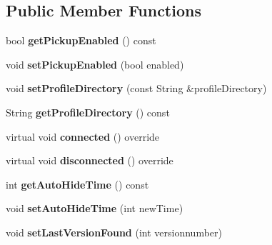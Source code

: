 \subsection*{Public Member Functions}
\begin{DoxyCompactItemize}
\item 
bool {\bfseries get\+Pickup\+Enabled} () const \hypertarget{class_settings_manager_abdb671f1012b61e3939d66e2c5a51ed6}{}\label{class_settings_manager_abdb671f1012b61e3939d66e2c5a51ed6}

\item 
void {\bfseries set\+Pickup\+Enabled} (bool enabled)\hypertarget{class_settings_manager_a625341681109806d4ab2b2501ba30ab9}{}\label{class_settings_manager_a625341681109806d4ab2b2501ba30ab9}

\item 
void {\bfseries set\+Profile\+Directory} (const String \&profile\+Directory)\hypertarget{class_settings_manager_a407dad99584114520c5aadc58b8bf941}{}\label{class_settings_manager_a407dad99584114520c5aadc58b8bf941}

\item 
String {\bfseries get\+Profile\+Directory} () const \hypertarget{class_settings_manager_aeaf4fd67dc3a4733dcf37bfadaa4de49}{}\label{class_settings_manager_aeaf4fd67dc3a4733dcf37bfadaa4de49}

\item 
virtual void {\bfseries connected} () override\hypertarget{class_settings_manager_a2d5e6d9c21a5ea7e574ca600a1d93719}{}\label{class_settings_manager_a2d5e6d9c21a5ea7e574ca600a1d93719}

\item 
virtual void {\bfseries disconnected} () override\hypertarget{class_settings_manager_a607feb1bce6a53dc2907653566a43977}{}\label{class_settings_manager_a607feb1bce6a53dc2907653566a43977}

\item 
int {\bfseries get\+Auto\+Hide\+Time} () const \hypertarget{class_settings_manager_a537a0bf338c4020efa197188a0deec49}{}\label{class_settings_manager_a537a0bf338c4020efa197188a0deec49}

\item 
void {\bfseries set\+Auto\+Hide\+Time} (int new\+Time)\hypertarget{class_settings_manager_a3b79a29f105519854b113d689e345f31}{}\label{class_settings_manager_a3b79a29f105519854b113d689e345f31}

\item 
void {\bfseries set\+Last\+Version\+Found} (int versionnumber)\hypertarget{class_settings_manager_ab66b7b0beeca459d573fe47b4a4f80b8}{}\label{class_settings_manager_ab66b7b0beeca459d573fe47b4a4f80b8}


\end{DoxyCompactItemize}
